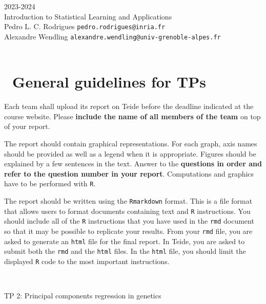 \begin{flushleft}
 \hfill {} 2023-2024 \\
Introduction to Statistical Learning and Applications \\
Pedro L. C. Rodrigues   \hfill  \texttt{pedro.rodrigues@inria.fr} \\
Alexandre Wendling \hfill \texttt{alexandre.wendling@univ-grenoble-alpes.fr} \\

\HRuleTop\\

\section*{\faExclamationTriangle~General guidelines for TPs}

Each team shall upload its report on Teide before the deadline indicated at the course website. Please \textbf{include the name of all members of the team} on top of your report. 

The report should contain graphical representations. For each graph, axis names should be provided as well as a legend when it is appropriate. Figures should be explained by a few sentences in the text. Answer to the \textbf{questions in order and refer to the question number in your report}. Computations and graphics have to be performed with \texttt{R}.

The report should be written using the \texttt{Rmarkdown} format. This is a file format that allows users to format documents containing text and \texttt{R} instructions. You should include all of the \texttt{R} instructions that you have used in the \texttt{rmd} document so that it may be possible to replicate your results. From your \texttt{rmd} file, you are asked to generate an \texttt{html} file for the final report. In Teide, you are asked to submit both the \texttt{rmd} and the \texttt{html} files. In the \texttt{html} file, you should limit the displayed \texttt{R} code to the most important instructions.

\HRuleTop\\
\begin{center}
\Large{TP 2: Principal components regression in genetics}
\end{center}
\HRuleBottom
\end{flushleft}

